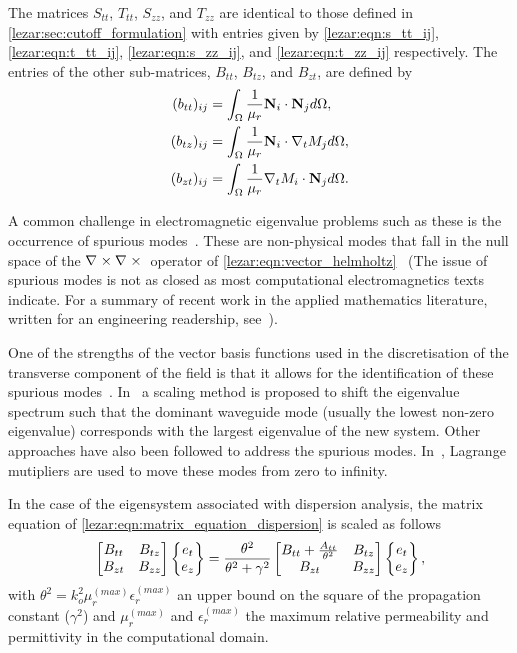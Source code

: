 The matrices $S_{tt}$, $T_{tt}$, $S_{zz}$, and $T_{zz}$ are identical
to those defined in \ref{lezar:sec:cutoff_formulation} with entries given by
\eqref{lezar:eqn:s_tt_ij}, \eqref{lezar:eqn:t_tt_ij}, \eqref{lezar:eqn:s_zz_ij}, and \eqref{lezar:eqn:t_zz_ij} respectively.  
The entries of the other sub-matrices, $B_{tt}$, $B_{tz}$, and
$B_{zt}$, are defined by
\begin{align}
(b_{tt})_{ij} &=
\int_{\Omega}{\frac{1}{\mu_r}\mathbf{N}_i\cdot\mathbf{N}_j}{d\Omega},\\
(b_{tz})_{ij} &=
\int_{\Omega}{\frac{1}{\mu_r}\mathbf{N}_i\cdot\nabla_t{M_j}}{d\Omega},\\
(b_{zt})_{ij} &=
\int_{\Omega}{\frac{1}{\mu_r}\nabla_t{M_i}\cdot\mathbf{N}_j}{d\Omega}.
\end{align}

A common challenge in electromagnetic eigenvalue problems such as
these is the occurrence of spurious
modes~\cite{Dav2005}.  These are non-physical
modes that fall in the null space of the $\nabla_{} \times {\nabla_{} \times {}}$ operator
of \eqref{lezar:eqn:vector_helmholtz}~\cite{Bos1998} (The issue of spurious
modes is not as closed as most computational electromagnetics texts
indicate. For a summary of recent work in the applied mathematics
literature, written for an engineering readership,
see~\cite{FerRaf2002}).

One of the strengths of the vector basis functions used in the
discretisation of the transverse component of the field is that it
allows for the identification of these spurious modes~\cite{Dav2005,
Jin2002}.  In~\cite{LeeSun1991} a scaling method is proposed to shift
the eigenvalue spectrum such that the dominant waveguide mode (usually
the lowest non-zero eigenvalue) corresponds with the largest
eigenvalue of the new system. Other approaches have also been followed
to address the spurious modes. In~\cite{VarDem2002}, Lagrange
mutipliers are used to move these modes from zero to infinity.

In the case of the eigensystem associated with dispersion analysis,
the matrix equation of \eqref{lezar:eqn:matrix_equation_dispersion} is
scaled as follows
\begin{equation}
    \label{lezar:eqn:matrix_equation_dispersion_scaled}
    \begin{bmatrix} B_{tt} & B_{tz}\\B_{zt} & B_{zz}\end{bmatrix}\begin{Bmatrix}e_t\\e_z\end{Bmatrix} =
    \frac{\theta^2}{\theta^2 +
    \gamma^2}\begin{bmatrix} B_{tt} +
    \frac{A_{tt}}{\theta^2} & B_{tz}\\B_{zt} & B_{zz}\end{bmatrix}\begin{Bmatrix}e_t\\e_z\end{Bmatrix},
\end{equation}
with $\theta^2 = k_o^2\mu_r^{(max)}\epsilon_r^{(max)}$ an upper bound on
the square of the propagation constant ($\gamma^2$) and $\mu_r^{(max)}$
and $\epsilon_r^{(max)}$ the maximum relative permeability and permittivity
in the computational domain.

